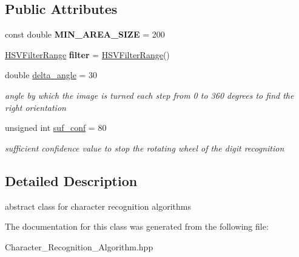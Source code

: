 \subsection*{Public Attributes}
\begin{DoxyCompactItemize}
\item 
\mbox{\label{class_image_processing_1_1_character___recognition___algorithm_aa3104edea691e7202e2abe0c044dabbe}} 
const double {\bfseries M\+I\+N\+\_\+\+A\+R\+E\+A\+\_\+\+S\+I\+ZE} = 200
\item 
\mbox{\label{class_image_processing_1_1_character___recognition___algorithm_adc5636619442cbfa3e276210a914b3f6}} 
\mbox{\hyperlink{struct_image_processing_1_1_h_s_v_filter_range}{H\+S\+V\+Filter\+Range}} {\bfseries filter} = \mbox{\hyperlink{struct_image_processing_1_1_h_s_v_filter_range}{H\+S\+V\+Filter\+Range}}()
\item 
\mbox{\label{class_image_processing_1_1_character___recognition___algorithm_afbab64ce9fff483a75b4533db4392f81}} 
double \mbox{\hyperlink{class_image_processing_1_1_character___recognition___algorithm_afbab64ce9fff483a75b4533db4392f81}{delta\+\_\+angle}} = 30
\begin{DoxyCompactList}\small\item\em angle by which the image is turned each step from 0 to 360 degrees to find the right orientation \end{DoxyCompactList}\item 
\mbox{\label{class_image_processing_1_1_character___recognition___algorithm_ac166463ea5fc4bf892dc2035467351ea}} 
unsigned int \mbox{\hyperlink{class_image_processing_1_1_character___recognition___algorithm_ac166463ea5fc4bf892dc2035467351ea}{suf\+\_\+conf}} = 80
\begin{DoxyCompactList}\small\item\em sufficient confidence value to stop the rotating wheel of the digit recognition \end{DoxyCompactList}\end{DoxyCompactItemize}


\subsection{Detailed Description}
abstract class for character recognition algorithms 

The documentation for this class was generated from the following file\+:\begin{DoxyCompactItemize}
\item 
Character\+\_\+\+Recognition\+\_\+\+Algorithm.\+hpp\end{DoxyCompactItemize}
